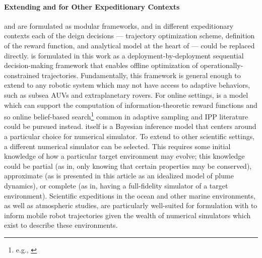 \paragraph{Extending \PHORTEX and \PHUMES for Other Expeditionary Contexts}
\PHORTEX and \PHUMES are formulated as modular frameworks, and in different expeditionary contexts each of the deign decisions --- trajectory optimization scheme, definition of the reward function, and analytical model at the heart of \PHUMES --- could be replaced directly. \PHORTEX is formulated in this work as a deployment-by-deployment sequential decision-making framework that enables offline optimization of operationally-constrained trajectories. Fundamentally, this framework is general enough to extend to any robotic system which may not have access to adaptive behaviors, such as subsea AUVs and extraplanetary rovers. For online settings, \PHUMES is a model which can support the computation of information-theoretic reward functions and so online belief-based search\footnote{e.g., \autocite{flaspohler2019information, Arora2017, Sun2017, sunberg2018online}} common in adaptive sampling and IPP literature could be pursued instead. \PHUMES itself is a Bayesian inference model that centers around a particular choice for numerical simulator. To extend to other scientific settings, a different numerical simulator can be selected. This requires some initial knowledge of how a particular target environment may evolve; this knowledge could be partial (as in, only knowing that certain properties may be conserved), approximate (as is presented in this article as an idealized model of plume dynamics), or complete (as in, having a full-fidelity simulator of a target environment). Scientific expeditions in the ocean and other marine environments, as well as atmospheric studies, are particularly well-suited for formulation with \PHUMES to inform mobile robot trajectories given the wealth of numerical simulators which exist to describe these environments. 

